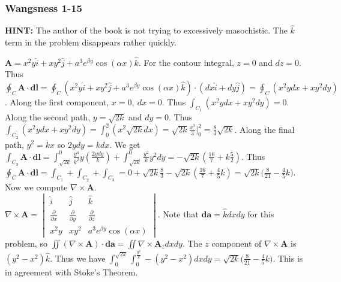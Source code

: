 \documentclass[oneside]{book}
\theoremstyle{definition}
\newcommand*\B[1]{\mathbf{#1}}
\begin{document}
\begin{figure}[!h]
  \centering
  \hfill
\end{figure}


\subsubsection{Wangsness 1-15}

\textbf{HINT:} The author of the book is not trying to excessively masochistic. The $\hat{k}$ term in the problem disappears rather quickly.

$\B{A} = x^2 y \hat{i} + xy^2 \hat{j} + a^3 e^{\beta y}\cos(\alpha x)\hat{k}$. For the contour integral, $z=0$ and $dz = 0$. Thus $\oint_{C} \B{A}\cdot \B{dl} = \oint_{C}(x^2 y\hat{i}+xy^2\hat{j} + a^3 e^{\beta y}\cos(\alpha x)\hat{k})\cdot(dx \hat{i}+dy\hat{j}) = \oint_{C}(x^2ydx+xy^2dy)$. Along the first component, $x=0,\ dx=0$. Thus $\int_{C_1}(x^2ydx + xy^2 dy) = 0$. Along the second path, $y= \sqrt{2k}$ and $dy=0$. Thus $\int_{C_2}(x^2ydx + xy^2dy) = \int_{0}^{2}(x^2\sqrt{2k}dx) = \sqrt{2k}\frac{x^3}{3}\bigg|_{0}^{2} =\frac{8}{3}\sqrt{2k}$. Along the final path, $y^2 = kx$ so $2ydy = kdx$. We get $\int_{C_3}\B{A}\cdot \B{dl} = \int_{\sqrt{2k}}^{0}\frac{y^4}{k^2}y(\frac{2ydy}{k}) + \int_{\sqrt{2k}}^{0}\frac{y^2}{k}y^2dy = -\sqrt{2k}(\frac{16}{7}+k\frac{5}{2})$. Thus $\oint_C \B{A}\cdot \B{dl} = \int_{C_1} + \int_{C_2} + \int_{C_3} = 0 + \sqrt{2k}\frac{8}{3} - \sqrt{2k}(\frac{16}{7}+\frac{4}{5}k)= \sqrt{2k}\big(\frac{8}{21}-\frac{4}{5}k\big)$. Now we compute $\nabla \times \B{A}$.\\
$\nabla \times \B{A} = \begin{vmatrix} \hat{i} & \hat{j} & \hat{k} \\ \frac{\partial}{\partial x} & \frac{\partial}{\partial y} & \frac{\partial}{\partial z} \\ x^2y & xy^2 & a^3 e^{\beta y}\cos(\alpha x) \end{vmatrix}$. Note that $\B{da} = \hat{k}dxdy$ for this problem, so $\iint (\nabla \times \B{A})\cdot \B{da} = \iint \nabla\times \B{A}_z dxdy$. The $z$ component of $\nabla\times \B{A}$ is $(y^2-x^2)\hat{k}$. Thus we have $\int_{0}^{\sqrt{2k}}\int_{0}^{\frac{y^2}{k}}-(y^2-x^2)dxdy = \sqrt{2k}\big(\frac{8}{21}-\frac{4}{5}k\big)$. This is in agreement with Stoke's Theorem.
\end{document}
